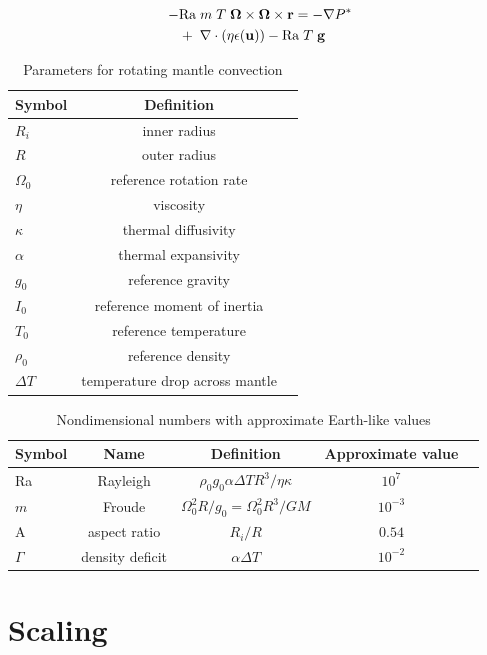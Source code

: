 \documentclass[extra,mreferee]{gji}
\begin{document}
\begin{equation}
\begin{aligned}
 - & \mathrm{Ra} \; m \; T \; \mitbf{\Omega} \times \mitbf{\Omega} \times \mathbf{r} = - \nabla P^* \\ 
&+ \; \nabla \cdot \left( \eta \epsilon (\mathbf{u}) \right) - \mathrm{Ra} \; T \; \mathbf{g}
\end{aligned}
\end{equation}

  
\fi

\begin{table}
\centering
\caption{Parameters for rotating mantle convection}
\label{tab:parameters}
\begin{tabular}{@{}lcc}
Symbol & Definition\\
\hline
$R_i$ & inner radius \\
$R$ & outer radius \\
$\Omega_0$ & reference rotation rate \\
$\eta$ & viscosity \\
$\kappa$ & thermal diffusivity \\
$\alpha$ &  thermal expansivity \\ 
$g_0$ & reference gravity \\
$I_0$ & reference moment of inertia \\
$T_0$ & reference temperature \\
$\rho_0$ & reference density \\ 
$\Delta T$ & temperature drop across mantle
\end{tabular}
\end{table}

\begin{table}
\centering
\caption{Nondimensional numbers with approximate Earth-like values}
\label{tab:nondim}
\begin{tabular}{@{}lcccc}
Symbol &  Name & Definition & Approximate value \\
\hline
Ra & Rayleigh &  $\rho_0 g_0 \alpha \Delta T R^3/\eta \kappa$ & $10^7$\\
$m$ & Froude & $\Omega_0^2 R/g_0 = \Omega_0^2 R^3/GM$ & $10^{-3}$ \\
A & aspect ratio & $R_i/R$ & $0.54$ \\
$\Gamma$ & density deficit &$ \alpha \Delta T$ & $10^{-2}$ \\
\end{tabular}
\end{table}
 
\section{Scaling}
\label{sec:scaling}
\end{document}
